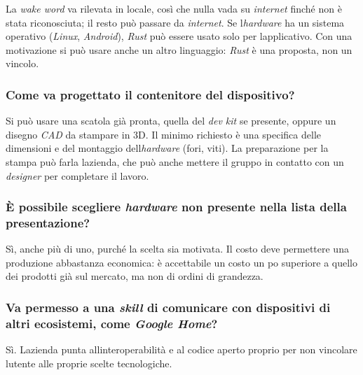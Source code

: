 \documentclass[12pt,a4paper]{article}
\begin{document}
La \emph{wake word} va rilevata in locale, così che nulla vada su \emph{internet} finché non è stata riconosciuta; il resto può passare da \emph{internet}. Se l\textquotesingle{}\emph{hardware} ha un sistema operativo (\emph{Linux}, \emph{Android}), \emph{Rust} può essere usato solo per l\textquotesingle applicativo. Con una motivazione si può usare anche un altro linguaggio: \emph{Rust} è una proposta, non un vincolo.

\hypertarget{come-va-progettato-il-contenitore-del-dispositivo}{%
\subsubsection{Come va progettato il contenitore del dispositivo?}}

Si può usare una scatola già pronta, quella del \emph{dev kit} se presente, oppure un disegno \emph{CAD} da stampare in 3D. Il minimo richiesto è una specifica delle dimensioni e del montaggio dell\textquotesingle{}\emph{hardware} (fori, viti). La preparazione per la stampa può farla l\textquotesingle azienda, che può anche mettere il gruppo in contatto con un \emph{designer} per completare il lavoro.

\hypertarget{uxe8-possibile-scegliere-hardware-non-presente-nella-lista-della-presentazione}{%
\subsubsection{\texorpdfstring{È possibile scegliere \emph{hardware} non presente nella lista della presentazione?}{È possibile scegliere hardware non presente nella lista della presentazione?}}}

Sì, anche più di uno, purché la scelta sia motivata. Il costo deve permettere una produzione abbastanza economica: è accettabile un costo un po\textquotesingle{} superiore a quello dei prodotti già sul mercato, ma non di ordini di grandezza.

\hypertarget{va-permesso-a-una-skill-di-comunicare-con-dispositivi-di-altri-ecosistemi-come-google-home}{%
\subsubsection{\texorpdfstring{Va permesso a una \emph{skill} di comunicare con dispositivi di altri ecosistemi, come \emph{Google Home}?}{Va permesso a una skill di comunicare con dispositivi di altri ecosistemi, come Google Home?}}}

Sì. L\textquotesingle azienda punta all\textquotesingle interoperabilità e al codice aperto proprio per non vincolare l\textquotesingle utente alle proprie scelte tecnologiche.
\end{document}
